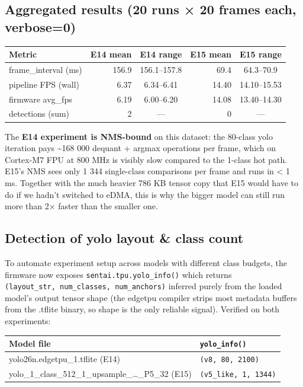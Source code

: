 \subsection{Aggregated results (20 runs × 20 frames each,
verbose=0)}\label{aggregated-results-20-runs-20-frames-each-verbose0}

{\def\LTcaptype{none} %
\begin{longtable}[]{@{}lrcrc@{}}
\toprule\noalign{}
Metric & E14 mean & E14 range & E15 mean & E15 range \\
\midrule\noalign{}
\endhead
\bottomrule\noalign{}
\endlastfoot
frame\_interval (ms) & 156.9 & 156.1--157.8 & 69.4 & 64.3--70.9 \\
pipeline FPS (wall) & 6.37 & 6.34--6.41 & 14.40 & 14.10--15.53 \\
firmware avg\_fps & 6.19 & 6.00--6.20 & 14.08 & 13.40--14.30 \\
detections (sum) & 2 & --- & 0 & --- \\
\end{longtable}
}

The \textbf{E14 experiment is NMS-bound} on this dataset: the 80-class
yolo iteration pays \textasciitilde168 000 dequant + argmax operations
per frame, which on Cortex-M7 FPU at 800 MHz is visibly slow compared to
the 1-class hot path. E15's NMS sees only 1 344 single-class comparisons
per frame and runs in \textless{} 1 ms. Together with the much heavier
786 KB tensor copy that E15 would have to do if we hadn't switched to
eDMA, this is why the bigger model can still run more than 2× faster
than the smaller one.

\subsection{Detection of yolo layout \& class
count}\label{detection-of-yolo-layout-class-count}

To automate experiment setup across models with different class budgets,
the firmware now exposes \texttt{sentai.tpu.yolo\_info()} which returns
\texttt{(layout\_str,\ num\_classes,\ num\_anchors)} inferred purely
from the loaded model's output tensor shape (the edgetpu compiler strips
most metadata buffers from the .tflite binary, so shape is the only
reliable signal). Verified on both experiments:

{\def\LTcaptype{none} %
\begin{longtable}[]{@{}ll@{}}
\toprule\noalign{}
Model file & \texttt{yolo\_info()} \\
\midrule\noalign{}
\endhead
\bottomrule\noalign{}
\endlastfoot
yolo26n.edgetpu\_1.tflite (E14) &
\texttt{(\textquotesingle{}v8\textquotesingle{},\ 80,\ 2100)} \\
yolo\_1\_class\_512\_1\_upsample\_\ldots\_P5\_32 (E15) &
\texttt{(\textquotesingle{}v5\_like\textquotesingle{},\ 1,\ 1344)} \\
\end{longtable}
}

